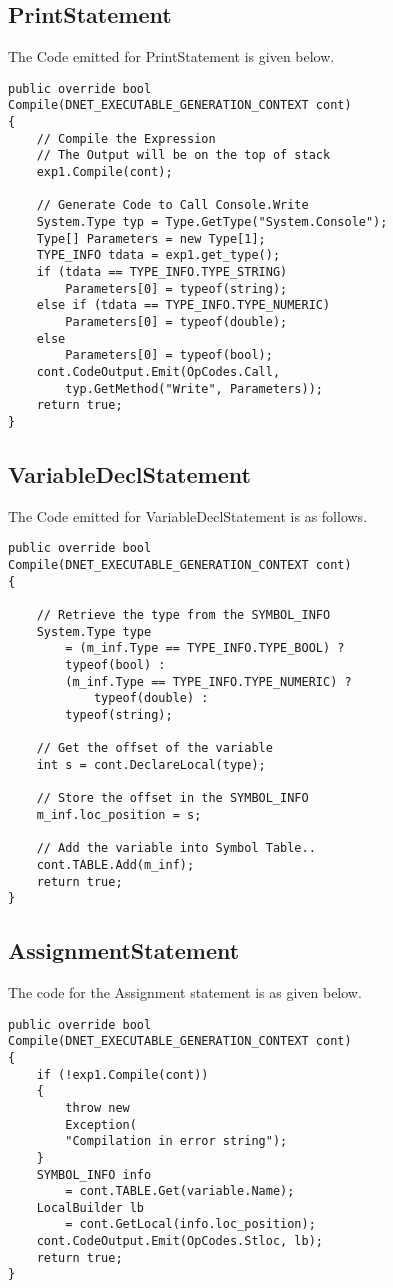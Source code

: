 \subsection{PrintStatement}
The Code emitted for PrintStatement is given below.
\lstset{style=csharp}
\begin{lstlisting}
public override bool 
Compile(DNET_EXECUTABLE_GENERATION_CONTEXT cont)
{
	// Compile the Expression
	// The Output will be on the top of stack
	exp1.Compile(cont);
	
	// Generate Code to Call Console.Write
	System.Type typ = Type.GetType("System.Console");
	Type[] Parameters = new Type[1];
	TYPE_INFO tdata = exp1.get_type();
	if (tdata == TYPE_INFO.TYPE_STRING)
		Parameters[0] = typeof(string);
	else if (tdata == TYPE_INFO.TYPE_NUMERIC)
		Parameters[0] = typeof(double);
	else
		Parameters[0] = typeof(bool);
	cont.CodeOutput.Emit(OpCodes.Call, 
		typ.GetMethod("Write", Parameters));
	return true;
}
\end{lstlisting}
\subsection{VariableDeclStatement}
The Code emitted for VariableDeclStatement is as follows.

\lstset{style=csharp}
\begin{lstlisting}
public override bool 
Compile(DNET_EXECUTABLE_GENERATION_CONTEXT cont)
{

	// Retrieve the type from the SYMBOL_INFO
	System.Type type 
		= (m_inf.Type == TYPE_INFO.TYPE_BOOL) ?
		typeof(bool) : 
		(m_inf.Type == TYPE_INFO.TYPE_NUMERIC) ?
			typeof(double) : 
		typeof(string);

	// Get the offset of the variable
	int s = cont.DeclareLocal(type);

	// Store the offset in the SYMBOL_INFO
	m_inf.loc_position = s;
	
	// Add the variable into Symbol Table..
	cont.TABLE.Add(m_inf);
	return true;
}
\end{lstlisting}
\subsection{AssignmentStatement}
The code for the Assignment statement is as given below.
\lstset{style=csharp}
\begin{lstlisting}
public override bool 
Compile(DNET_EXECUTABLE_GENERATION_CONTEXT cont)
{
	if (!exp1.Compile(cont))
	{
		throw new 
		Exception(
		"Compilation in error string");
	}
	SYMBOL_INFO info 
		= cont.TABLE.Get(variable.Name);
	LocalBuilder lb 
		= cont.GetLocal(info.loc_position);
	cont.CodeOutput.Emit(OpCodes.Stloc, lb);
	return true;
}
\end{lstlisting}

